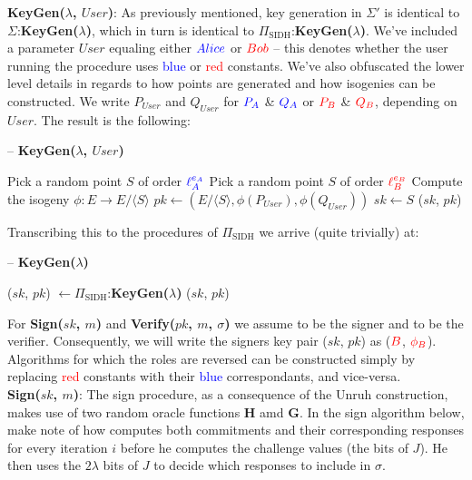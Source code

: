 \noindent
\textbf{KeyGen($\lambda$, $User$)}: As previously mentioned, key generation in $\Sigma'$ is identical to $\Sigma$:\textbf{KeyGen($\lambda$)}, which in turn is identical to $\Pi_{\text{SIDH}}$:\textbf{KeyGen($\lambda$)}. We've included a parameter $User$ equaling either $\textcolor{blue}{Alice}$ or $\textcolor{red}{Bob}$ -- this denotes whether the user running the procedure uses \textcolor{blue}{blue} or \textcolor{red}{red} constants. We've also obfuscated the lower level details in regards to how points are generated and how isogenies can be constructed. We write $P_{User}$ and $Q_{User}$ for $\textcolor{blue}{P_A}$ \& $\textcolor{blue}{Q_A}$ or $\textcolor{red}{P_B}$ \& $\textcolor{red}{Q_B}$, depending on $User$.  The result is the following:

\begin{algorithm}
\caption{-- \textbf{KeyGen($\lambda$, $User$)}}\label{alg:keygensig}
\begin{algorithmic}[1]
	\State Pick a random point $S$ of order $\textcolor{blue}{\ell_{A}^{e_A}}$
\EndIf
{}
	\State Pick a random point $S$ of order $\textcolor{red}{\ell_{B}^{e_B}}$
\EndIf
\State Compute the isogeny $\phi: E \rightarrow E/\langle S \rangle$
\State $pk \gets (E/\langle S \rangle, \phi(P_{User}), \phi(Q_{User}))$
\State $sk \gets S$
\State \Return ($sk$, $pk$)
\end{algorithmic}
\end{algorithm}

\noindent
Transcribing this to the procedures of $\Pi_{\text{SIDH}}$ we arrive (quite trivially) at:\\

\begin{algorithm}
\caption{-- \textbf{KeyGen($\lambda$)}}\label{euclid}
\begin{algorithmic}[1]
\State ($sk$, $pk$) $\gets \Pi_{\text{SIDH}}$:\textbf{KeyGen($\lambda$)}
\State \Return ($sk$, $pk$)
\end{algorithmic}
\end{algorithm}

For \textbf{Sign($sk$, $m$)} and \textbf{Verify($pk$, $m$, $\sigma$)} we assume \bob to be the signer and \alice to be the verifier. Consequently, we will write the signers key pair ($sk$, $pk$) as ($\textcolor{red}{B}$, $\textcolor{red}{\phi_B}$). Algorithms for which the roles are reversed can be constructed simply by replacing \textcolor{red}{red} constants with their \textcolor{blue}{blue} correspondants, and vice-versa.\\  

\noindent
\textbf{Sign($sk$, $m$)}: The sign procedure, as a consequence of the Unruh construction, makes use of two random oracle functions \textbf{H} amd \textbf{G}. In the sign algorithm below, make note of how \bob computes both commitments and their corresponding responses for every iteration $i$ before he computes the challenge values (the bits of $J$). He then uses the $2\lambda$ bits of $J$ to decide which responses to include in $\sigma$.\\

